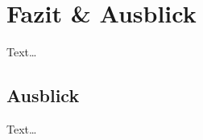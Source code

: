 \section{Fazit \& Ausblick}
\label{sec:fazit}

Text\dots

\subsection*{Ausblick}
\label{sec:ausblick}

Text\dots
